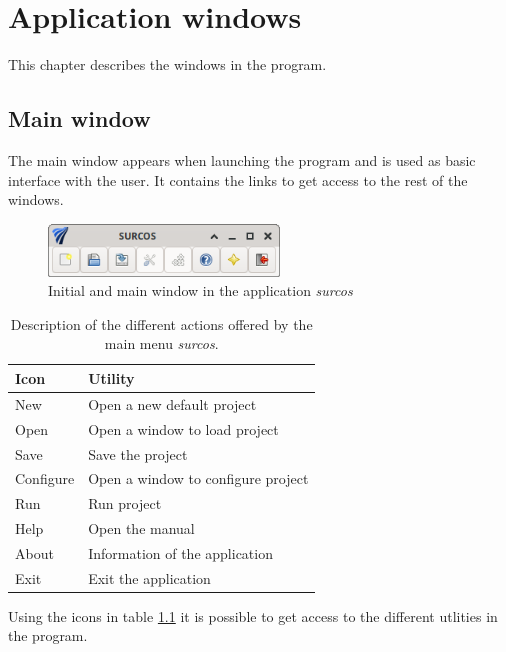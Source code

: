 \chapter{Application windows}

This chapter describes the windows in the program.

\section{Main window}

The main window appears when launching the program and is used as basic
interface with the user. It contains the links to get access to the rest of the
windows.

\begin{figure}[!h]
\begin{center}
\includegraphics*[height=1.4cm]{images/mprincipalEN.png}
\caption{Initial and main window in the application \emph{surcos}}
  \label{mainWindow}
\end{center}
\end{figure}

\begin{table}[h]\footnotesize
\begin{center}
\begin{tabular}{ll}
Icon & Utility \\
\hline
New & Open a new default project \\
Open & Open a window to load project \\
Save & Save the project \\
Configure & Open a window to configure project \\
Run & Run project \\
Help & Open the manual \\
About & Information of the application \\
Exit & Exit the application
\end{tabular}
\end{center}
\caption{Description of the different actions offered by the main menu
  \emph{surcos}.}\label{mainWindowIcons}
\end{table}

Using the icons in table \ref{mainWindowIcons} it is possible to get access to
the different utlities in the program.

